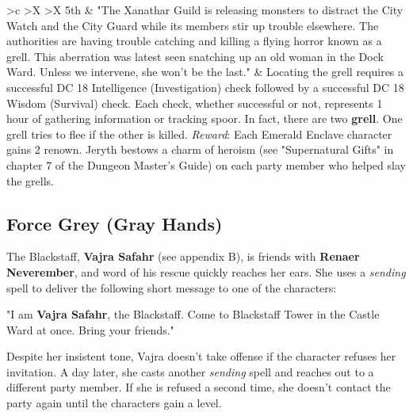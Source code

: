 \documentclass[10pt,a4paper,twoside,twocolumn,openany,nodeprecatedcode]{dndbook}
\begin{document}
\begin{DndTable}{>{\hsize}c >{\hsize}X >{\hsize}X}
5th & "The Xanathar Guild is releasing monsters to distract the City Watch and the City Guard while its members stir up trouble elsewhere. The authorities are having trouble catching and killing a flying horror known as a grell. This aberration was latest seen snatching up an old woman in the Dock Ward. Unless we intervene, she won't be the last." & Locating the grell requires a successful DC 18 Intelligence (Investigation) check followed by a successful DC 18 Wisdom (Survival) check. Each check, whether successful or not, represents 1 hour of gathering information or tracking spoor. In fact, there are two \textbf{grell}. One grell tries to flee if the other is killed. \textit{Reward}: Each Emerald Enclave character gains 2 renown. Jeryth bestows a charm of heroism (see "Supernatural Gifts" in chapter 7 of the Dungeon Master's Guide) on each party member who helped slay the grells.\\
\end{DndTable}


\subsection{Force Grey (Gray Hands)}
The Blackstaff, \textbf{Vajra Safahr} (see appendix B), is friends with \textbf{Renaer Neverember}, and word of his rescue quickly reaches her ears. She uses a \textit{sending} spell to deliver the following short message to one of the characters:
\begin{DndReadAloud}{}
"I am \textbf{Vajra Safahr}, the Blackstaff. Come to Blackstaff Tower in the Castle Ward at once. Bring your friends."
\end{DndReadAloud}

Despite her insistent tone, Vajra doesn't take offense if the character refuses her invitation. A day later, she casts another \textit{sending} spell and reaches out to a different party member. If she is refused a second time, she doesn't contact the party again until the characters gain a level.
\end{document}
